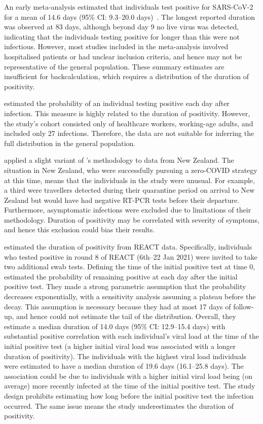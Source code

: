 \documentclass[thesis.tex]{subfiles}
\begin{document}
An early meta-analysis estimated that individuals test positive for SARS-CoV-2 for a mean of 14.6 days (95\% CI: 9.3--20.0 days)~\autocite{cevikShedding}.
The longest reported duration was observed at 83 days, although beyond day 9 no live virus was detected, indicating that the individuals testing positive for longer than this were not infectious.
However, most studies included in the meta-analysis involved hospitalised patients or had unclear inclusion criteria, and hence may not be representative of the general population.
These summary estimates are insufficient for backcalculation, which requires a distribution of the duration of positivity.

\Textcite{hellewellPCRSensitivity} estimated the probability of an individual testing positive each day after infection.
This measure is highly related to the duration of positivity.
However, the study's cohort consisted only of healthcare workers, \ie working-age adults, and included only 27 infections.
Therefore, the data are not suitable for inferring the full distribution in the general population.

\Textcite{binnySensitivity} applied a slight variant of \textcite{hellewellPCRSensitivity}'s methodology to data from New Zealand.
The situation in New Zealand, who were successfully pursuing a zero-COVID strategy at this time, means that the individuals in the study were unusual.
For example, a third were travellers detected during their quarantine period on arrival to New Zealand but would have had negative RT-PCR tests before their departure.
Furthermore, asymptomatic infections were excluded due to limitations of their methodology.
Duration of positivity may be correlated with severity of symptoms, and hence this exclusion could bias their results.

\Textcite{ealesCharacterising} estimated the duration of positivity from REACT data.
Specifically, individuals who tested positive in round 8 of REACT (6th--22 Jan 2021) were invited to take two additional swab tests.
Defining the time of the initial positive test at time 0, \textcite{ealesCharacterising} estimated the probability of remaining positive at each day after the initial positive test.
They made a strong parametric assumption that the probability decreases exponentially, with a sensitivity analysis assuming a plateau before the decay.
This assumption is necessary because they had at most 17 days of follow-up, and hence could not estimate the tail of the distribution.
Overall, they estimate a median duration of 14.0 days (95\% CI: 12.9--15.4 days) with substantial positive correlation with each individual’s viral load at the time of the initial positive test (\ie a higher initial viral load was associated with a longer duration of positivity).
The individuals with the highest viral load individuals were estimated to have a median duration of 19.6 days (16.1--25.8 days).
The association could be due to individuals with a higher initial viral load being (on average) more recently infected at the time of the initial positive test.
The study design prohibits estimating how long before the initial positive test the infection occurred.
The same issue means the study underestimates the duration of positivity.
\end{document}
